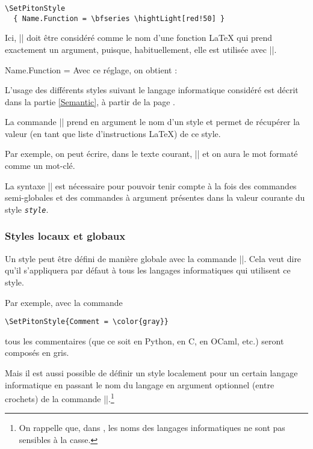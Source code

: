 \documentclass[dvipsnames,svgnames]{article}
\begin{document}
\begin{Verbatim}
\SetPitonStyle
  { Name.Function = \bfseries \hightLight[red!50] }
\end{Verbatim}

Ici, |\highLight[red!50]| doit être considéré comme le nom d'une fonction LaTeX qui prend exactement un argument,
puisque, habituellement, elle est utilisée avec ||.

\medskip
\begingroup
\SetPitonStyle 
  { Name.Function = \bfseries \highLight[red!50] }
Avec ce réglage, on obtient : 
\endgroup


\bigskip
L'usage des différents styles suivant le langage informatique considéré est décrit dans la partie \ref{Semantic}, à
partir de la page \pageref{Semantic}. 



\bigskip
{}
La commande |\PitonStyle| prend en argument le nom d'un style et permet de récupérer la valeur (en tant que liste
d'instructions LaTeX) de ce style.

\smallskip
Par exemple, on peut écrire, dans le texte courant, |{}| et on aura 
le mot {} formaté comme un mot-clé.

\smallskip
La syntaxe |{}| est nécessaire pour pouvoir tenir compte à la fois des commandes
semi-globales et des commandes à argument présentes dans la valeur courante du style \texttt{\textsl{style}}.


\subsubsection{Styles locaux et globaux}

Un style peut être défini de manière globale avec la commande |\SetPitonStyle|. Cela veut dire qu'il s'appliquera
par défaut à tous les langages informatiques qui utilisent ce style.

\medskip
Par exemple, avec la commande 
\begin{Verbatim}
\SetPitonStyle{Comment = \color{gray}}
\end{Verbatim}
tous les commentaires (que ce soit en Python, en C, en OCaml, etc.) seront composés en gris.

\bigskip
Mais il est aussi possible de définir un style localement pour un certain langage informatique en passant le nom du
langage en argument optionnel (entre crochets) de la commande |\SetPitonStyle|.\footnote{On rappelle que, dans
  , les noms des langages informatiques ne sont pas sensibles à la casse.}
\end{document}
